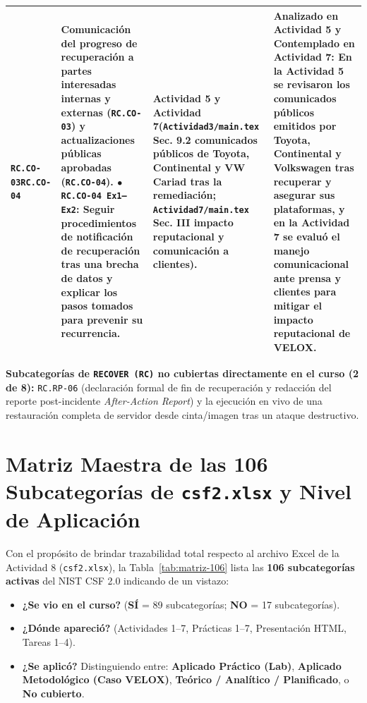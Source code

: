 \documentclass[letterpaper,11pt]{article}
\begin{document}
\begin{longtable}{|C{1.5cm}|L{5.3cm}|L{4.3cm}|L{5.8cm}|}
\texttt{RC.CO-03}\newline \texttt{RC.CO-04} &
\textbf{Comunicación del progreso de recuperación a partes interesadas internas y externas (\texttt{RC.CO-03}) y actualizaciones públicas aprobadas (\texttt{RC.CO-04}).}\newline
$\bullet$ \texttt{RC.CO-04 Ex1--Ex2}: Seguir procedimientos de notificación de recuperación tras una brecha de datos y explicar los pasos tomados para prevenir su recurrencia. &
\textbf{Actividad 5 y Actividad 7}\newline (\texttt{Actividad3/main.tex} Sec. 9.2 comunicados públicos de Toyota, Continental y VW Cariad tras la remediación; \texttt{Actividad7/main.tex} Sec. III impacto reputacional y comunicación a clientes). &
\textbf{Analizado en Actividad 5 y Contemplado en Actividad 7:}\newline
En la Actividad 5 se revisaron los comunicados públicos emitidos por Toyota, Continental y Volkswagen tras recuperar y asegurar sus plataformas, y en la Actividad 7 se evaluó el manejo comunicacional ante prensa y clientes para mitigar el impacto reputacional de VELOX. \\
\hline
\end{longtable}
\endgroup

\noindent\textbf{Subcategorías de \texttt{RECOVER (RC)} no cubiertas directamente en el curso (2 de 8):} \texttt{RC.RP-06} (declaración formal de fin de recuperación y redacción del reporte post-incidente \textit{After-Action Report}) y la ejecución en vivo de una restauración completa de servidor desde cinta/imagen tras un ataque destructivo.

\section{Matriz Maestra de las 106 Subcategorías de \texttt{csf2.xlsx} y Nivel de Aplicación}

Con el propósito de brindar trazabilidad total respecto al archivo Excel de la Actividad 8 (\texttt{csf2.xlsx}), la Tabla~\ref{tab:matriz-106} lista las \textbf{106 subcategorías activas} del NIST CSF 2.0 indicando de un vistazo:
\begin{itemize}[leftmargin=1.0cm, itemsep=1pt]
    \item \textbf{¿Se vio en el curso?} (\textbf{SÍ} = 89 subcategorías; \textbf{NO} = 17 subcategorías).
    \item \textbf{¿Dónde apareció?} (Actividades 1--7, Prácticas 1--7, Presentación HTML, Tareas 1--4).
    \item \textbf{¿Se aplicó?} Distinguiendo entre: \textbf{Aplicado Práctico (Lab)}, \textbf{Aplicado Metodológico (Caso VELOX)}, \textbf{Teórico / Analítico / Planificado}, o \textbf{No cubierto}.
\end{itemize}
\end{document}
